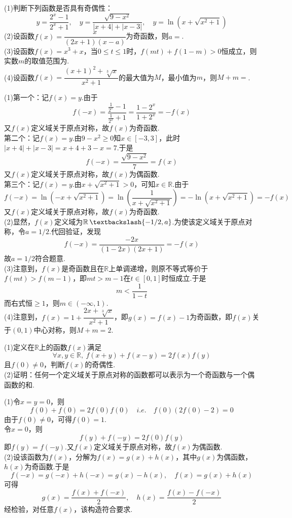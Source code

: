 \documentclass[lang=cn, zihao=5]{elegantbook}
\newcommand{\ssb}[1]{\left( #1 \right)}
\newcommand{\R}{\mathbb{R}}
\newcommand{\tk}{\uline{\hspace{4em}}}
\DeclareMathOperator{\setjianfa}{\textbackslash}
\begin{document}
\begin{example}
	(1)判断下列函数是否具有奇偶性：$$y = \frac{2^x-1}{2^x+1},\quad y=\frac{\sqrt{9-x^2}}{|x+4|+|x-3|},\quad y=\ln \ssb{x + \sqrt{x^2+1}}$$
	(2)设函数$f(x)=\dfrac{x}{(2x+1)(x-a)}$为奇函数，则$a=$\tk . \\
	(3)设函数$f(x)=x^3+x$，当$0 \leq t \leq 1$时，$f(mt)+f(1-m)>0$恒成立，则实数$m$的取值范围为\tk . \\
	(4)设函数$f(x)=\dfrac{(x+1)^2+\sqrt[3]{x}}{x^2+1}$的最大值为$M$，最小值为$m$，则$M+m=$\tk .
\end{example}
\begin{solution}
	(1)第一个：记$f(x)=y$.由于$$f(-x) = \frac{\frac{1}{2^x} -1}{\frac{1}{2^x} +1} = \frac{1-2^x}{1+2^x} = -f(x)$$
	又$f(x)$定义域关于原点对称，故$f(x)$为奇函数. \\
	第二个：记$f(x)=y$.由$9-x^2 \geq 0$知$x \in [-3,3]$，此时$|x+4|+|x-3|=x+4+3-x=7$.于是$$f(-x)=\frac{\sqrt{9-x^2}}{7}=f(x)$$
	又$f(x)$定义域关于原点对称，故$f(x)$为偶函数. \\
	第三个：记$f(x)=y$.由$x + \sqrt{x^2+1} > 0$，可知$x \in \R$.由于$$f(-x) = \ln \ssb{-x+\sqrt{x^2+1}} = \ln \ssb{\frac{1}{x+\sqrt{x^2+1}}} = -\ln \ssb{x + \sqrt{x^2+1}} = -f(x)$$
	又$f(x)$定义域关于原点对称，故$f(x)$为奇函数. \\
	(2)显然，$f(x)$定义域为$\R \setjianfa \{-1/2,a \}$.为使该定义域关于原点对称，令$a=1/2$.代回验证，发现$$f(-x) = \frac{-2x}{(1-2x)(2x+1)} = -f(x)$$
	故$a=1/2$符合题意. \\
	(3)注意到，$f(x)$是奇函数且在$\R$上单调递增，则原不等式等价于$f(mt)>f(m-1)$，即$mt>m-1$在$t \in [0,1]$时恒成立.于是$$m < \frac{1}{1-t}$$
	而右式恒$\geq 1$，则$m \in (-\infty ,1)$. \\
	(4)注意到，$f(x)=1+\dfrac{2x+\sqrt[3]{x}}{x^2+1}$，即$g(x)=f(x)-1$为奇函数，即$f(x)$关于$(0,1)$中心对称，则$M+m=2$.
\end{solution}

\begin{example}
	(1)定义在$\R$上的函数$f(x)$满足$$\forall x,y \in \R ,~f(x+y)+f(x-y)=2f(x)f(y)$$且$f(0) \neq 0$，判断$f(x)$的奇偶性. \\
	(2)证明：任何一个定义域关于原点对称的函数都可以表示为一个奇函数与一个偶函数的和.
\end{example}
\begin{solution}
	(1)令$x=y=0$，则$$f(0)+f(0)=2f(0)f(0) \quad i.e. \quad f(0)\ssb{2f(0)-2}=0$$
	由于$f(0) \neq 0$，可得$f(0)=1$. \\
	令$x=0$，则$$f(y)+f(-y)=2f(0)f(y)$$
	即$f(y)=f(-y)$.又$f(x)$定义域关于原点对称，故$f(x)$为偶函数. \\
	(2)设该函数为$f(x)$，分解为$f(x)=g(x)+h(x)$，其中$g(x)$为偶函数，$h(x)$为奇函数.于是$$f(-x)=g(-x)+h(-x)=g(x)-h(x),\quad f(x)=g(x)+h(x)$$
	可得$$g(x)=\frac{f(x)+f(-x)}{2},\quad h(x)=\frac{f(x)-f(-x)}{2}$$
	经检验，对任意$f(x)$，该构造符合要求.
\end{solution}
\end{document}
